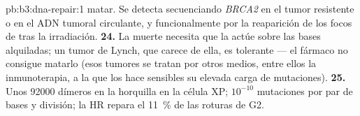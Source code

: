 \begin{solution}{pb:b3:dna-repair:1}
matar. Se detecta secuenciando \emph{BRCA2} en el tumor resistente o en
el ADN tumoral circulante, y funcionalmente por la reaparición de los
focos de  tras la irradiación.
\textbf{24.} La muerte necesita que la  actúe sobre las bases alquiladas; un tumor de Lynch, que
carece de ella, es tolerante --- el fármaco no consigue matarlo (esos
tumores se tratan por otros medios, entre ellos la inmunoterapia, a la
que los hace sensibles su elevada carga de mutaciones).
\textbf{25.} Unos \num{92000} dímeros en la horquilla en la célula XP;
$10^{-10}$ mutaciones por par de bases y división; la HR repara el
\qty{11}{\%} de las roturas de G2.
\end{solution}

